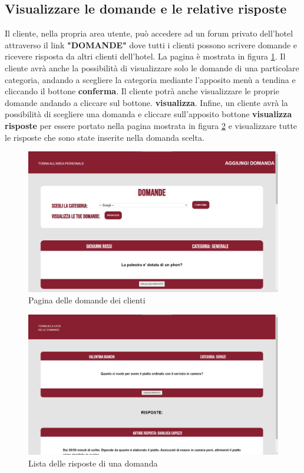 \documentclass [a4paper, 12pt]{book}
\begin{document}
\subsection{Visualizzare le domande e le relative risposte}
Il cliente, nella propria area utente, può accedere ad un forum privato dell'hotel attraverso il link \textbf{"DOMANDE"} dove tutti i clienti possono scrivere domande e ricevere risposta da altri clienti dell'hotel. La pagina è mostrata in figura \ref{DomandeCliente}. Il cliente avrà anche la possibilità di visualizzare solo le domande di una particolare categoria, andando a scegliere la categoria mediante l'apposito menù a tendina e cliccando il bottone \textbf{conferma}. Il cliente potrà anche visualizzare le proprie domande andando a cliccare sul bottone.  \textbf{visualizza}. Infine, un cliente avrà la possibilità di scegliere una domanda e cliccare sull'apposito bottone \textbf{visualizza risposte} per essere portato nella pagina mostrata in figura \ref{RisposteDomandaCliente} e visualizzare tutte le risposte che sono state inserite nella domanda scelta.\newpage
\begin{figure}[!h]
\centering
\includegraphics[scale=0.3]{DomandeCliente.png}
\caption{Pagina delle domande dei clienti}
\label{DomandeCliente}
\end{figure}
\begin{figure}[!h]
\centering
\includegraphics[scale=0.3]{RisposteDomandaCliente.png}
\caption{Lista delle risposte di una domanda}
\label{RisposteDomandaCliente}
\end{figure}
\end{document}
